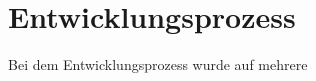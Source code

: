 \section{Entwicklungsprozess} %
\label{sec:entwicklungsprozess}

Bei dem Entwicklungsprozess wurde auf mehrere 
